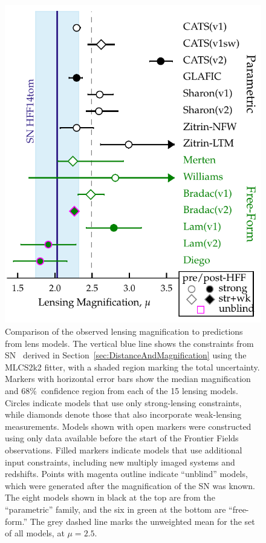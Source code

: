 \begin{figure}
\begin{center}
\includegraphics[width=\columnwidth]{FIG/snTomas_magnifications}
\caption{ 
Comparison of the observed lensing magnification to predictions from
lens models. The vertical blue line shows the constraints from
SN \tomas\ derived in Section~\ref{sec:DistanceAndMagnification} using the
MLCS2k2 fitter, with a shaded region marking the total
uncertainty. Markers with horizontal error bars show the median
magnification and 68\%\ confidence region from each of the 15 lensing
models.  Circles indicate models that use only strong-lensing
constraints, while diamonds denote those that also incorporate
weak-lensing measurements.  Models shown with open markers were
constructed using only data available before the start of the Frontier
Fields observations.  Filled markers indicate models that use
additional input constraints, including new multiply imaged systems
and redshifts.  Points with magenta outline indicate ``unblind''
models, which were generated after the magnification of the SN was
known. The eight models shown in black at the top are from
the ``parametric'' family, and the six in green at the bottom are
``free-form.''  The grey dashed line marks the unweighted mean for the
set of all models, at $\mu=2.5$.
\label{fig:LensingTest} }
\end{center}
\end{figure}

